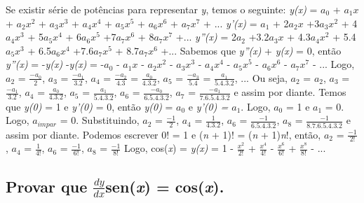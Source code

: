 Se existir série de potências para representar \textit{y}, temos o seguinte:
\newline
\textit{y(x)} = ${a_0}$ + ${a_1}$${x}$ + ${a_2}$${x^2}$ + ${a_3}$${x^3}$ + ${a_4}$${x^4}$ + ${a_5}$${x^5}$ + ${a_6}$${x^6}$ + ${a_7}$${x^7}$ + ...
\newline
\textit{y'(x)} = ${a_1}$ + 2${a_2}$${x}$ +3${a_3}$${x^2}$ + 4${a_4}$${x^3}$ + 5${a_5}$${x^4}$ + 6${a_6}$${x^5}$ +7${a_7}$${x^6}$ + 8${a_7}$${x^7}$ +...
\newline
\textit{y''(x)} = 2${a_2}$ +3.2${a_3}$${x}$ + 4.3${a_4}$${x^2}$ + 5.4${a_5}$${x^3}$ + 6.5${a_6}$${x^4}$ +7.6${a_7}$${x^5}$ + 8.7${a_7}$${x^6}$ +...
\newline
Sabemos que \textit{y''(x)} + \textit{y(x)} = 0, então \textit{y''(x)} = -\textit{y(x)}
\newline
-\textit{y(x)} = -${a_0}$ - ${a_1}$${x}$ - ${a_2}$${x^2}$ - ${a_3}$${x^3}$ - ${a_4}$${x^4}$ - ${a_5}$${x^5}$ - ${a_6}$${x^6}$ - ${a_7}$${x^7}$ - ...
\newline
Logo, ${a_2}$ = $\frac{-{a_0}}{2}$, ${a_3}$ = $\frac{-{a_1}}{3.2}$, ${a_4}$ = $\frac{-{a_2}}{4.3}$ = $\frac{{a_0}}{4.3.2}$, ${a_5}$ = $\frac{-{a_3}}{5.4}$ = $\frac{{a_1}}{5.4.3.2}$, ...
\newline
Ou seja,  ${a_2}$ = ${a_2}$,  ${a_3}$ = $\frac{-{a_1}}{3.2}$,  ${a_4}$ = $\frac{{a_0}}{4.3.2}$,  ${a_5}$ = $\frac{{a_1}}{5.4.3.2}$,  ${a_6}$ = $\frac{-{a_0}}{6.5.4.3.2}$,  ${a_7}$ = $\frac{-{a_1}}{7.6.5.4.3.2}$ e assim por diante.
\newline
Temos que  \textit{y(0)} = 1 e \textit{y'(0)} = 0, então \textit{y(0)} = ${a_0}$ e \textit{y'(0) = ${a_1}$}. Logo, ${a_0}$ = 1 e ${a_1}$ = 0.  Logo, ${a_{impar}}$ = 0.
\newline
Substituindo, ${a_2}$ = $\frac{{-1}}{2}$, ${a_4}$ = $\frac{{1}}{4.3.2}$, ${a_6}$ = $\frac{{-1}}{6.5.4.3.2}$, ${a_8}$ = $\frac{{-1}}{8.7.6.5.4.3.2}$ e assim por diante.
\newline
Podemos escrever 0! = 1 e (\textit{n} + 1)! = (\textit{n} + 1)\textit{n}!, então,  ${a_2}$ = $\frac{{-1}}{2!}$, ${a_4}$ = $\frac{{1}}{4!}$, ${a_6}$ = $\frac{{-1}}{6!}$, ${a_8}$ = $\frac{{-1}}{8!}$
\newline
Logo, cos(\textit{x}) = \textit{y(x)} = 1 - $\frac{x^2}{2!}$ + $\frac{x^4}{4!}$ - $\frac{x^6}{6!}$ + $\frac{x^8}{8!}$ - ...


\subsection{Provar que $\frac{dy}{dx}$sen(\textit{x}) = cos(\textit{x}).}

